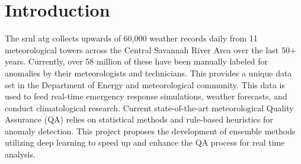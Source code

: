 \section{Introduction}
\label{sec:introduction}

The \gls{srnl} \gls{atg} \cite{HomeATG} collects upwards of 60,000 weather records daily from 11 meteorological towers across the Central Savannah River Area over the last 50+ years. Currently, over 58 million of these have been manually labeled for anomalies by their meteorologists and technicians. This provides a unique data set in the Department of Energy and meteorological community. This data is used to feed real-time emergency response simulations, weather forecasts, and conduct climatological research. Current state-of-the-art meteorological Quality Assurance (QA) relies on statistical methods and rule-based heuristics for anomaly detection. This project proposes the development of ensemble methods utilizing deep learning to speed up and enhance the QA process for real time analysis.
